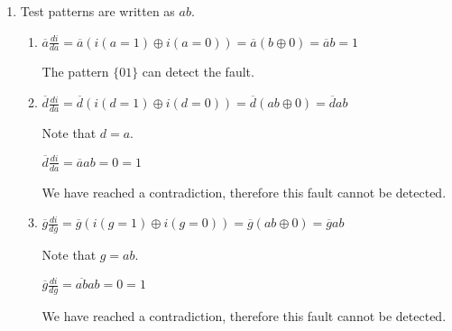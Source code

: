 \documentclass[a4paper,12pt]{article}
\begin{document}
\begin{enumerate}

        \item Test patterns are written as $ab$.
            \begin{enumerate}
                \item $\overline{a}\frac{di}{da} = \overline{a}(i(a = 1) \oplus i(a = 0)) = \overline{a}(b \oplus 0) = \overline{a}b = 1$

                    The pattern $\{01\}$ can detect the fault.

                \item $\overline{d}\frac{di}{da} = \overline{d}(i(d = 1) \oplus i(d = 0)) = \overline{d}(ab \oplus 0) = \overline{d}ab$

                    Note that $d = a$.

                    $\overline{d}\frac{di}{da} = \overline{a}ab = 0 = 1$

                    We have reached a contradiction, therefore this fault cannot be detected.

                \item $\overline{g}\frac{di}{dg} = \overline{g}(i(g = 1) \oplus i(g = 0)) = \overline{g}(ab \oplus 0) = \overline{g}ab$

                    Note that $g = ab$.

                    $\overline{g}\frac{di}{dg} = \overline{ab}ab = 0 = 1$

                    We have reached a contradiction, therefore this fault cannot be detected.
            \end{enumerate}


\end{enumerate}
\end{document}
